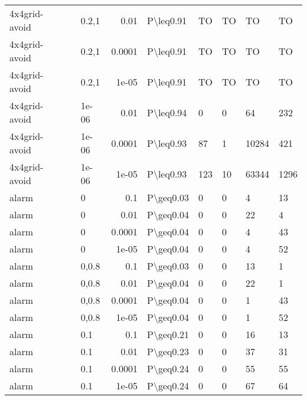 \begin{longtable}{lllrlllll}
 4x4grid-avoid &           & 0.2,1 & 0.01   & P\textbackslash{}leq0.91  & TO   & TO   & TO       & TO      \\
 4x4grid-avoid &           & 0.2,1 & 0.0001 & P\textbackslash{}leq0.91  & TO   & TO   & TO       & TO      \\
 4x4grid-avoid &           & 0.2,1 & 1e-05  & P\textbackslash{}leq0.91  & TO   & TO   & TO       & TO      \\
 4x4grid-avoid &           & 1e-06 & 0.01   & P\textbackslash{}leq0.94  & 0    & 0    & 64       & 232     \\
 4x4grid-avoid &           & 1e-06 & 0.0001 & P\textbackslash{}leq0.93  & 87   & 1    & 10284    & 421     \\
 4x4grid-avoid &           & 1e-06 & 1e-05  & P\textbackslash{}leq0.93  & 123  & 10   & 63344    & 1296    \\
 alarm         &           & 0     & 0.1    & P\textbackslash{}geq0.03  & 0    & 0    & 4        & 13      \\
 alarm         &           & 0     & 0.01   & P\textbackslash{}geq0.04  & 0    & 0    & 22       & 4       \\
 alarm         &           & 0     & 0.0001 & P\textbackslash{}geq0.04  & 0    & 0    & 4        & 43      \\
 alarm         &           & 0     & 1e-05  & P\textbackslash{}geq0.04  & 0    & 0    & 4        & 52      \\
 alarm         &           & 0,0.8 & 0.1    & P\textbackslash{}geq0.03  & 0    & 0    & 13       & 1       \\
 alarm         &           & 0,0.8 & 0.01   & P\textbackslash{}geq0.04  & 0    & 0    & 22       & 1       \\
 alarm         &           & 0,0.8 & 0.0001 & P\textbackslash{}geq0.04  & 0    & 0    & 1        & 43      \\
 alarm         &           & 0,0.8 & 1e-05  & P\textbackslash{}geq0.04  & 0    & 0    & 1        & 52      \\
 alarm         &           & 0.1   & 0.1    & P\textbackslash{}geq0.21  & 0    & 0    & 16       & 13      \\
 alarm         &           & 0.1   & 0.01   & P\textbackslash{}geq0.23  & 0    & 0    & 37       & 31      \\
 alarm         &           & 0.1   & 0.0001 & P\textbackslash{}geq0.24  & 0    & 0    & 55       & 55      \\
 alarm         &           & 0.1   & 1e-05  & P\textbackslash{}geq0.24  & 0    & 0    & 67       & 64      \\

\end{longtable}
